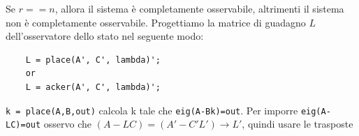 \begin{tcolorbox}
\begin{tcolorbox}[title=Matlab]
\begin{verbatim}
    \end{verbatim}
        Se $r == n$, allora il sistema è completamente osservabile, altrimenti il
        sistema non è completamente osservabile. Progettiamo la matrice di guadagno $L$
        dell'osservatore dello stato nel seguente modo:
        \begin{verbatim}
    L = place(A', C', lambda)';
    or
    L = acker(A', C', lambda)';
\end{verbatim}
        \verb|k = place(A,B,out)| calcola k tale che \verb|eig(A-Bk)=out|. Per imporre \verb|eig(A-LC)=out| osservo che $(A - L C) = (A' - C' L') \rightarrow L'$, quindi usare le trasposte
    \end{tcolorbox}
\end{tcolorbox}


